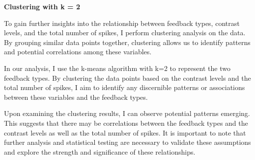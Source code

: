\documentclass[
]{article}
\newenvironment{Shaded}{\begin{snugshade}}{\end{snugshade}}
\newcommand{\AttributeTok}[1]{\textcolor[rgb]{0.13,0.29,0.53}{#1}}
\newcommand{\ConstantTok}[1]{\textcolor[rgb]{0.56,0.35,0.01}{#1}}
\newcommand{\DecValTok}[1]{\textcolor[rgb]{0.00,0.00,0.81}{#1}}
\newcommand{\FunctionTok}[1]{\textcolor[rgb]{0.13,0.29,0.53}{\textbf{#1}}}
\newcommand{\NormalTok}[1]{#1}
\newcommand{\OtherTok}[1]{\textcolor[rgb]{0.56,0.35,0.01}{#1}}
\newcommand{\SpecialCharTok}[1]{\textcolor[rgb]{0.81,0.36,0.00}{\textbf{#1}}}
\begin{document}
\textbf{Clustering with k = 2}

To gain further insights into the relationship between feedback types,
contrast levels, and the total number of spikes, I perform clustering
analysis on the data. By grouping similar data points together,
clustering allows us to identify patterns and potential correlations
among these variables.

In our analysis, I use the k-means algorithm with k=2 to represent the
two feedback types. By clustering the data points based on the contrast
levels and the total number of spikes, I aim to identify any discernible
patterns or associations between these variables and the feedback types.

Upon examining the clustering results, I can observe potential patterns
emerging. This suggests that there may be correlations between the
feedback types and the contrast levels as well as the total number of
spikes. It is important to note that further analysis and statistical
testing are necessary to validate these assumptions and explore the
strength and significance of these relationships.

\begin{Shaded}
\end{Shaded}
\end{document}
